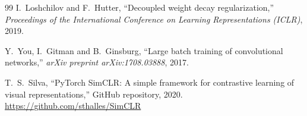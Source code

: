 \documentclass[twoside,a4paper,11pt]{article}
\begin{document}
\begin{thebibliography}{99}
I.\ Loshchilov and F.\ Hutter,
``Decoupled weight decay regularization,''
{\em Proceedings of the International Conference on Learning
Representations (ICLR)}, 2019.

Y.\ You, I.\ Gitman and B.\ Ginsburg,
``Large batch training of convolutional networks,''
{\em arXiv preprint arXiv:1708.03888}, 2017.

T.\ S.\ Silva,
``PyTorch SimCLR: A simple framework for contrastive learning of visual
representations,'' GitHub repository, 2020.
\url{https://github.com/sthalles/SimCLR}

\end{thebibliography}
\end{document}
